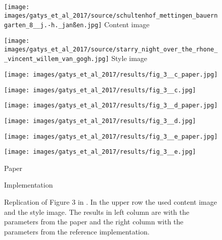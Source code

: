 \begin{figure}[H]
	\centering
	\begin{minipage}[t]{0.45\textwidth}
		\centering
		\texttt{[image: images/gatys\_et\_al\_2017/source/schultenhof\_mettingen\_bauerngarten\_8\_\_j.-h.\_janßen.jpg]}
		Content image
	\end{minipage}
	\hfill%
	\begin{minipage}[t]{0.45\textwidth}
		\centering
		\texttt{[image: images/gatys\_et\_al\_2017/source/starry\_night\_over\_the\_rhone\_\_vincent\_willem\_van\_gogh.jpg]}
		Style image
	\end{minipage}
\hfill%
	\begin{minipage}[t]{0.45\textwidth}
		\centering
		\texttt{[image: images/gatys\_et\_al\_2017/results/fig\_3\_\_c\_paper.jpg]}
	\end{minipage}
	\hfill%
	\begin{minipage}[t]{0.45\textwidth}
		\centering
		\texttt{[image: images/gatys\_et\_al\_2017/results/fig\_3\_\_c.jpg]} 
	\end{minipage}
	\hfill%
	\begin{minipage}[t]{0.45\textwidth}
		\centering
		\texttt{[image: images/gatys\_et\_al\_2017/results/fig\_3\_\_d\_paper.jpg]} 
	\end{minipage}
	\hfill%
	\begin{minipage}[t]{0.45\textwidth}
		\centering
		\texttt{[image: images/gatys\_et\_al\_2017/results/fig\_3\_\_d.jpg]}
	\end{minipage}
	\hfill%
	\begin{minipage}[t]{0.45\textwidth}
		\centering
		\texttt{[image: images/gatys\_et\_al\_2017/results/fig\_3\_\_e\_paper.jpg]} 
	\end{minipage}
	\hfill%
	\begin{minipage}[t]{0.45\textwidth}
		\centering
		\texttt{[image: images/gatys\_et\_al\_2017/results/fig\_3\_\_e.jpg]}
	\end{minipage}
	\hfill%
\begin{minipage}[t]{0.45\textwidth}
	\centering
	Paper
\end{minipage}
\hfill%
\begin{minipage}[t]{0.45\textwidth}
	\centering
	Implementation
\end{minipage}
	\caption{Replication of Figure 3 in \cite{GEB+2017}. In the upper row the used content image and the style image. The results in  left column are with the parameters from the paper and the right column with the parameters from the reference implementation.}
	\label{fig:GEB+2017_fig3}
\end{figure}

